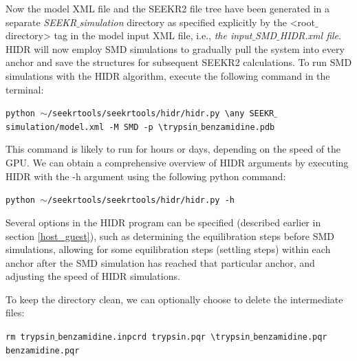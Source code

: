 \documentclass[9pt,training,pubversion]{livecoms}
\begin{document}
\noindent Now the model XML file and the SEEKR2 file tree have been generated in a separate \textit{SEEKR$\_$simulation} directory as specified explicitly by the <root$\_$directory> tag in the model input XML file, i.e., \textit{the input$\_$SMD$\_$HIDR.xml file}. HIDR will now employ SMD simulations to gradually pull the system into every anchor and save the structures for subsequent SEEKR2 calculations. To run SMD simulations with the HIDR algorithm, execute the following command in the terminal:

\begin{tcolorbox}[colback=black!8!white, colframe=black!50!black, fontlower=\tiny, left=2pt, right=2pt, top=2pt, bottom=2pt] 
\texttt{python $\sim$/seekrtools/seekrtools/hidr/hidr.py \textbackslash \linebreak any SEEKR$\_$simulation/model.xml -M SMD -p \textbackslash \linebreak trypsin$\_$benzamidine.pdb}
\end{tcolorbox}

\noindent This command is likely to run for hours or days, depending on the speed of the GPU. We can obtain a comprehensive overview of HIDR arguments by executing HIDR with the -h argument using the following python command:

\begin{tcolorbox}[colback=black!8!white, colframe=black!50!black, fontlower=\tiny, left=2pt, right=2pt, top=2pt, bottom=2pt] 
\texttt{python $\sim$/seekrtools/seekrtools/hidr/hidr.py -h}
\end{tcolorbox}

\noindent Several options in the HIDR program can be specified (described earlier in section  \ref{host_guest}), such as determining the equilibration steps before SMD simulations, allowing for some equilibration steps (settling steps) within each anchor after the SMD simulation has reached that particular anchor, and adjusting the speed of HIDR simulations. 

\noindent To keep the directory clean, we can optionally choose to delete the intermediate files:

\begin{tcolorbox}[colback=black!8!white, colframe=black!50!black, fontlower=\tiny, left=2pt, right=2pt, top=2pt, bottom=2pt] 
\texttt{rm trypsin$\_$benzamidine.inpcrd trypsin.pqr \textbackslash \linebreak trypsin$\_$benzamidine.pqr benzamidine.pqr}
\end{tcolorbox}
\end{document}
